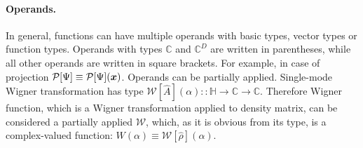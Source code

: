 \paragraph{Operands.}
In general, functions can have multiple operands with basic types, vector types or function types.
Operands with types $\mathbb{C}$ and $\mathbb{C}^D$ are written in parentheses,
while all other operands are written in square brackets.
For example, in case of projection $\mathcal{P}[\Psi] \equiv \mathcal{P}[\Psi](\boldsymbol{x})$.
Operands can be partially applied.
Single-mode Wigner transformation has type $\mathcal{W}[\hat{A}](\alpha) :: \mathbb{H} \rightarrow \mathbb{C} \rightarrow \mathbb{C}$.
Therefore Wigner function, which is a Wigner transformation applied to density matrix, can be considered a partially applied $\mathcal{W}$,
which, as it is obvious from its type, is a complex-valued function: $W(\alpha) \equiv \mathcal{W}[\hat{\rho}](\alpha)$.
